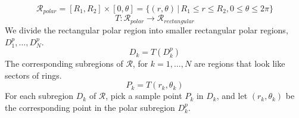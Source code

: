 \begin{frame}
\begin{columns}
\end{columns}
%
\begin{overlayarea}{\textheight}{5cm}
  {
  $$\mathcal{R}_{polar} = [R_1,R_2] \times [0,\theta] = \{ (r,\theta) \, | \, R_1 \leqslant r \leqslant R_2, 0 \leqslant \theta \leqslant 2\pi\}$$
  }
  {
  $$T \colon \mathcal{R}_{polar} \to \mathcal{R}_{rectangular}$$
  We divide the rectangular polar region into smaller rectangular polar regions, $D_1^p, \ldots, D_N^p$.
  }
  {
  $$D_k = T(D_k^p)$$
  The corresponding subregions of $\mathcal{R}$, for $k = 1,\ldots, N$ are regions that look like sectors of rings.
  }
  {
  $$P_k = T(r_k,\theta_k)$$
   For each subregion $D_k$ of $\mathcal{R}$, pick a sample point $P_k$ in $D_k$, and let $(r_k,\theta_k)$ be the corresponding point in the polar subregion $D_k^p$.
  }
\end{overlayarea}
\end{frame}

